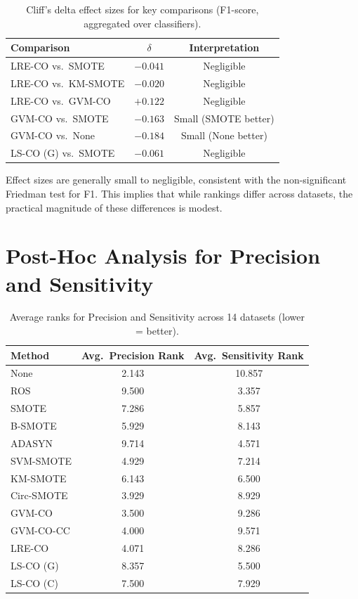 \begin{table}[H]
\centering
\caption{Cliff's delta effect sizes for key comparisons (F1-score, aggregated over classifiers).}
\label{tab:stat:effect_size}
\begin{tabular}{lcc}
\toprule
\textbf{Comparison} & \textbf{$\delta$} & \textbf{Interpretation} \\
\midrule
LRE-CO vs.\ SMOTE    & $-0.041$ & Negligible \\
LRE-CO vs.\ KM-SMOTE & $-0.020$ & Negligible \\
LRE-CO vs.\ GVM-CO   & $+0.122$ & Negligible \\
GVM-CO vs.\ SMOTE    & $-0.163$ & Small (SMOTE better) \\
GVM-CO vs.\ None     & $-0.184$ & Small (None better) \\
LS-CO (G) vs.\ SMOTE & $-0.061$ & Negligible \\
\bottomrule
\end{tabular}
\end{table}

Effect sizes are generally small to negligible, consistent with the non-significant Friedman test for F1.
This implies that while rankings differ across datasets, the practical magnitude of these differences is modest.


\section{Post-Hoc Analysis for Precision and Sensitivity}
\label{sec:stat:prec_sens}

\begin{table}[H]
\centering
\caption{Average ranks for Precision and Sensitivity across 14 datasets (lower = better).}
\label{tab:stat:prec_sens_ranks}
\begin{tabular}{lcc}
\toprule
\textbf{Method} & \textbf{Avg.\ Precision Rank} & \textbf{Avg.\ Sensitivity Rank} \\
\midrule
None       & 2.143 & 10.857 \\
ROS        & 9.500 & 3.357 \\
SMOTE      & 7.286 & 5.857 \\
B-SMOTE    & 5.929 & 8.143 \\
ADASYN     & 9.714 & 4.571 \\
SVM-SMOTE  & 4.929 & 7.214 \\
KM-SMOTE   & 6.143 & 6.500 \\
Circ-SMOTE & 3.929 & 8.929 \\
\midrule
GVM-CO     & 3.500 & 9.286 \\
GVM-CO-CC  & 4.000 & 9.571 \\
LRE-CO     & 4.071 & 8.286 \\
LS-CO (G)  & 8.357 & 5.500 \\
LS-CO (C)  & 7.500 & 7.929 \\
\bottomrule
\end{tabular}
\end{table}

